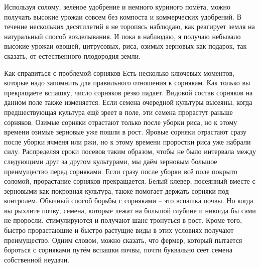 \documentclass[a4paper]{book}
\begin{document}
Используя солому, зелёное удобрение и немного куриного помёта, можно получать
высокие урожаи совсем без компоста и коммерческих удобрений. В течение нескольких
десятилетий я не торопясь наблюдаю, как реагирует земля на натуральный способ
возделывания. И пока я наблюдаю, я получаю небывало высокие урожаи овощей, цитрусовых,
риса, озимых зерновых как подарок, так сказать, от естественного плодородия земли.

Как справиться с проблемой сорняков
Есть несколько ключевых моментов, которые надо запомнить для правильного
отношения к сорнякам.
Как только вы прекращаете вспашку, число сорняков резко падает. Видовой состав
сорняков на данном поле также изменяется.
Если семена очередной культуры высеяны, когда предшествующая культура ещё зреет в
поле, эти семена прорастут раньше сорняков. Озимые сорняки отрастают только после
уборки риса, но к этому времени озимые зерновые уже пошли в рост. Яровые сорняки
отрастают сразу после уборки ячменя или ржи, но к этому времени проростки риса уже
набрали силу. Распределяя сроки посевов таким образом, чтобы не было интервала между
следующими друг за другом культурами, мы даём зерновым большое преимущество перед
сорняками.
Если сразу после уборки всё поле покрыто соломой, прорастание сорняков
прекращается. Белый клевер, посеянный вместе с зерновыми как покровная культура, также
помогает держать сорняки под контролем.
Обычный способ борьбы с сорняками – это вспашка почвы. Но когда вы рыхлите почву,
семена, которые лежат на большой глубине и никогда бы сами не проросли, стимулируются
и получают шанс тронуться в рост. Кроме того, быстро прорастающие и быстро растущие
виды в этих условиях получают преимущество. Одним словом, можно сказать, что фермер,
который пытается бороться с сорняками путём вспашки почвы, почти буквально сеет семена
собственной неудачи.
\end{document}
